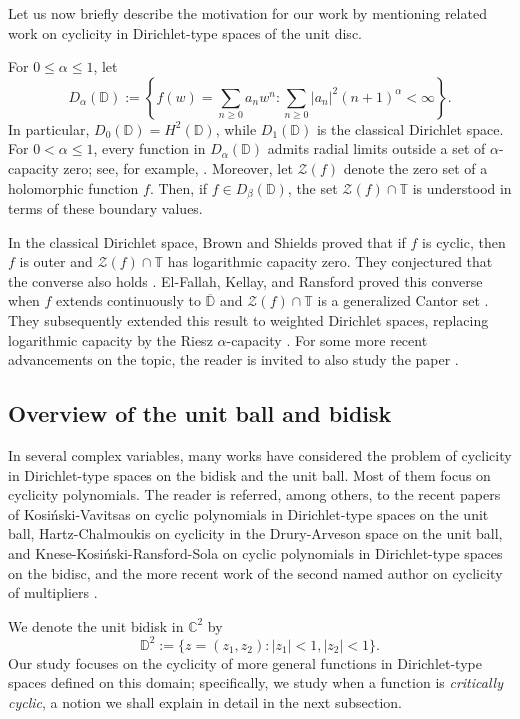 \documentclass[a4paper,12pt]{amsart}
\theoremstyle{definition}
\begin{document}
Let us now briefly describe the motivation for our work by mentioning related work on cyclicity in Dirichlet-type spaces of the unit disc.

For \(0\leq\alpha\leq1\), let
\[
    D_\alpha(\mathbb D)
    :=
    \left\{
        f(w)=\sum_{n\geq0}a_nw^n:
        \sum_{n\geq0}|a_n|^2(n+1)^\alpha<\infty
    \right\}.
\]
In particular, \(D_0(\mathbb D)=H^2(\mathbb D)\), while
\(D_1(\mathbb D)\) is the classical Dirichlet space. For
\(0<\alpha\leq1\), every function in \(D_\alpha(\mathbb D)\) admits
radial limits outside a set of \(\alpha\)-capacity zero; see,
for example, \cite{ElFallah2014_book}. Moreover, let $\mathcal{Z}(f)$ denote the zero set of a holomorphic function $f.$ Then, if $f\in D_{\beta}(\mathbb{D})$, the set
\(\mathcal{Z}(f)\cap\mathbb T\) is understood in terms of these boundary values.

In the classical Dirichlet space, Brown and Shields proved that if
\(f\) is cyclic, then \(f\) is outer and \(\mathcal{Z}(f)\cap\mathbb T\) has
logarithmic capacity zero. They conjectured that the converse also
holds \cite{BS84}. El-Fallah, Kellay, and Ransford proved this converse
when \(f\) extends continuously to \(\overline{\mathbb D}\) and
\(\mathcal{Z}(f)\cap\mathbb T\) is a generalized Cantor set
\cite{ElFallah_BS_Conj}. They subsequently extended this result to
weighted Dirichlet spaces, replacing logarithmic capacity by the Riesz 
\(\alpha\)-capacity \cite{ELFALLAH2010_Cantor}. For some more recent advancements on the topic, the reader is invited to also study the paper \cite{Vavitsas3}.
\subsection{Overview of the unit ball and bidisk}
In several complex variables, many works have considered the problem of cyclicity in Dirichlet-type spaces on the bidisk and the unit ball. Most of them focus on cyclicity polynomials. The reader is referred, among others, to the recent papers of Kosi\'nski-Vavitsas on cyclic polynomials in Dirichlet-type spaces on the unit ball, Hartz-Chalmoukis on cyclicity in the Drury-Arveson space on the unit ball, and Knese-Kosi\'nski-Ransford-Sola on cyclic polynomials in Dirichlet-type spaces on the bidisc, and the more recent work of the second named author on cyclicity of multipliers \cite{Kosinski_Vavitsas2023,ChalmoukisHartz2024,Knese2019_Aniso_Bidisk,Vavitsas2, Pouriya_SecondPaper}.

We denote the unit bidisk in $\mathbb{C}^2$ by
$$\mathbb{D}^2:=\{z=(z_1,z_2):|z_1|<1,|z_2|<1\}.$$
Our study focuses on the cyclicity of more general functions in Dirichlet-type spaces defined on this domain; specifically, we study when a function is \textit{critically cyclic}, a notion we shall explain in detail in the next subsection. 
\end{document}
